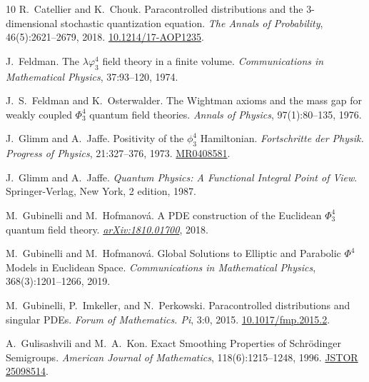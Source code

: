 \documentclass[11pt]{article}
\newcommand{\tmtextit}[1]{{\itshape{#1}}}
\begin{document}
\begin{thebibliography}{10}
  R.~Catellier  and  K.~Chouk.
  {\newblock}Paracontrolled distributions and the 3-dimensional stochastic
  quantization equation. {\newblock}\tmtextit{The Annals of Probability},
  46(5):2621--2679, 2018.
  {\newblock}\href{Https://doi.org/10.1214/17-AOP1235}{10.1214/17-AOP1235}.{\newblock}
  
  J.~Feldman. {\newblock}The $\lambda
  \varphi^4_3$ field theory in a finite volume.
  {\newblock}\tmtextit{Communications in Mathematical Physics}, 37:93--120,
  1974.{\newblock}
  
  J.~S.~Feldman  and  K.~Osterwalder.
  {\newblock}The Wightman axioms and the mass gap for weakly coupled
  $\Phi^4_3$ quantum field theories. {\newblock}\tmtextit{Annals of Physics},
  97(1):80--135, 1976.{\newblock}
  
  J.~Glimm  and  A.~Jaffe.
  {\newblock}Positivity of the $\phi^4_3$ Hamiltonian.
  {\newblock}\tmtextit{Fortschritte der Physik. Progress of Physics},
  21:327--376, 1973.
  {\newblock}\href{Https://mathscinet.ams.org/mathscinet-getitem?mr=0408581}{MR0408581}.{\newblock}
  
  J.~Glimm  and  A.~Jaffe.
  {\newblock}\tmtextit{Quantum Physics: A Functional Integral Point of View}.
  {\newblock}Springer-Verlag, New York, 2  edition, 1987.{\newblock}
  
  M.~Gubinelli  and  M.~Hofmanov{\'a}.
  {\newblock}A PDE construction of the Euclidean $\Phi^4_3$ quantum field
  theory.
  {\newblock}\tmtextit{\href{Http://arxiv.org/abs/1810.01700}{arXiv:1810.01700}},
  2018.{\newblock}
  
  M.~Gubinelli  and  M.~Hofmanov{\'a}.
  {\newblock}Global Solutions to Elliptic and Parabolic $\Phi^4$ Models in
  Euclidean Space. {\newblock}\tmtextit{Communications in Mathematical
  Physics}, 368(3):1201--1266, 2019.{\newblock}
  
  M.~Gubinelli, P.~Imkeller, and 
  N.~Perkowski. {\newblock}Paracontrolled distributions and singular PDEs.
  {\newblock}\tmtextit{Forum of Mathematics. Pi}, 3:0, 2015.
  {\newblock}\href{Https://doi.org/10.1017/fmp.2015.2}{10.1017/fmp.2015.2}.{\newblock}
  
  A.~Gulisashvili  and  M.~A.~Kon.
  {\newblock}Exact Smoothing Properties of Schr{\"o}dinger Semigroups.
  {\newblock}\tmtextit{American Journal of Mathematics}, 118(6):1215--1248,
  1996. {\newblock}\href{Http://www.jstor.org/stable/25098514}{JSTOR 25098514}.{\newblock}
  

\end{thebibliography}
\end{document}
